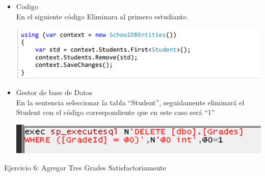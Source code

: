 \begin{itemize}
	\item Codigo
	\\En el siguiente código Eliminara al primero estudiante.

	\begin{center}
	\includegraphics[width=15cm]{./Imagenes/5a} 
	\end{center}

	\item Gestor de base de Datos 
	\\En la sentencia seleccionar la tabla “Student”, seguidamente eliminará el Student con el código correspondiente que en este caso será “1”
	\begin{center}
	\includegraphics[width=15cm]{./Imagenes/5b} 
	\end{center}
	
\end{itemize} 
\newpage
Ejercicio 6: Agregar Tres Grades Satisfactoriamente

